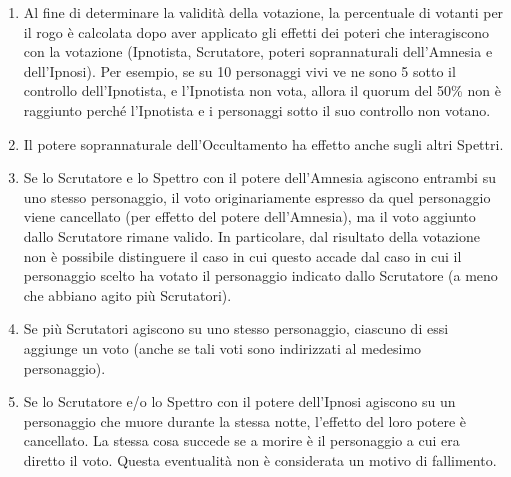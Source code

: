 \documentclass[a4paper,10pt]{article}
\begin{document}
\begin{enumerate}
 \item Al fine di determinare la validità della votazione, la percentuale di votanti per il rogo è calcolata dopo aver applicato gli effetti dei poteri che interagiscono con la votazione (Ipnotista, Scrutatore, poteri soprannaturali dell'Amnesia e dell'Ipnosi).
 Per esempio, se su 10 personaggi vivi ve ne sono 5 sotto il controllo dell'Ipnotista, e l'Ipnotista non vota, allora il quorum del 50\% non è raggiunto perché l'Ipnotista e i personaggi sotto il suo controllo non votano.

 \item Il potere soprannaturale dell'Occultamento ha effetto anche sugli altri Spettri.
 
 \item Se lo Scrutatore e lo Spettro con il potere dell'Amnesia agiscono entrambi su uno stesso personaggio, il voto originariamente espresso da quel personaggio viene cancellato (per effetto del potere dell'Amnesia), ma il voto aggiunto dallo Scrutatore rimane valido. In particolare, dal risultato della votazione non è possibile distinguere il caso in cui questo accade dal caso in cui il personaggio scelto ha votato il personaggio indicato
 dallo Scrutatore (a meno che abbiano agito più Scrutatori).
 
 \item Se più Scrutatori agiscono su uno stesso personaggio, ciascuno di essi aggiunge un voto (anche se tali voti sono indirizzati al medesimo personaggio).
 
 \item Se lo Scrutatore e/o lo Spettro con il potere dell'Ipnosi agiscono su un personaggio che muore durante la stessa notte, l'effetto del loro potere è cancellato. 
 La stessa cosa succede se a morire è il personaggio a cui era diretto il voto. Questa eventualità non è considerata un motivo di fallimento.
 
 

\end{enumerate}
\end{document}
